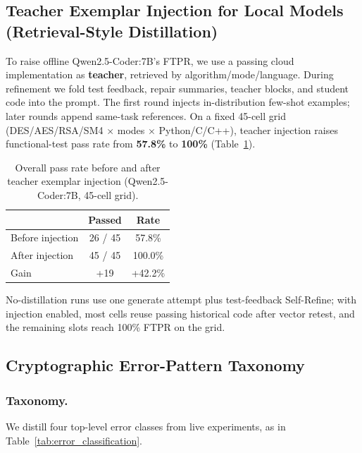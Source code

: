 \documentclass[runningheads]{llncs}
\begin{document}
\subsection{Teacher Exemplar Injection for Local Models (Retrieval-Style Distillation)}
\label{subsec:distillation}
To raise offline Qwen2.5-Coder:7B's FTPR, we use a passing cloud implementation as \textbf{teacher}, retrieved by algorithm/mode/language. During refinement we fold test feedback, repair summaries, teacher blocks, and student code into the prompt. The first round injects in-distribution few-shot examples; later rounds append same-task references. On a fixed 45-cell grid (DES/AES/RSA/SM4 $\times$ modes $\times$ Python/C/C++), teacher injection raises functional-test pass rate from \textbf{57.8\%} to \textbf{100\%} (Table~\ref{tab:distillation_overall}).
\begin{table}[H]
  \centering
  \caption{Overall pass rate before and after teacher exemplar injection (Qwen2.5-Coder:7B, 45-cell grid).}
  \label{tab:distillation_overall}
  {\scriptsize\setlength{\tabcolsep}{2.5pt}\renewcommand{\arraystretch}{0.95}
  \begin{tabular}{l c c}
    \toprule
    & Passed & Rate \\
    \midrule
    Before injection & 26 / 45 & 57.8\% \\
    After injection  & 45 / 45 & 100.0\% \\
    Gain             & +19     & +42.2\% \\
    \bottomrule
  \end{tabular}
  }
\end{table}
No-distillation runs use one generate attempt plus test-feedback Self-Refine; with injection enabled, most cells reuse passing historical code after vector retest, and the remaining slots reach 100\% FTPR on the grid.

\subsection{Cryptographic Error-Pattern Taxonomy}
\subsubsection{Taxonomy.}
We distill four top-level error classes from live experiments, as in Table~\ref{tab:error_classification}.
\end{document}
